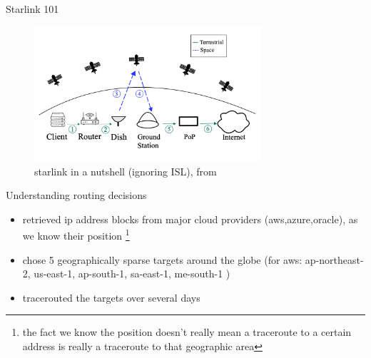 \documentclass[NET,english,beameralt]{tumbeamer}
\begin{document}

\begin{frame}{Starlink 101}
\begin{figure}
    \includegraphics[width=0.75\textwidth]{pics/starlink-101.png}
    \caption[short]{starlink in a nutshell (ignoring ISL), from \cite{izhikevich2023democratizing}}
\end{figure}
\end{frame}

\begin{frame}{Understanding routing decisions}
\begin{itemize}
    \item retrieved ip address blocks from major cloud providers (aws,azure,oracle), as we know their position \footnote[]{the fact we know the position doesn't really mean a traceroute to a certain address is really a traceroute to that geographic area}
    \item chose 5 geographically sparse targets around the globe (for aws: ap-northeast-2, us-east-1, ap-south-1, sa-east-1, me-south-1 )
    \item tracerouted the targets over several days 
\end{itemize}
\end{frame}
\end{document}

